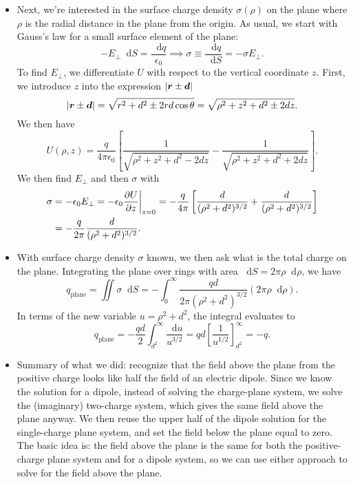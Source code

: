\documentclass[11pt, a4paper]{article}
\newcommand{\diff}{\mathop{}\!\mathrm{d}} %
\renewcommand{\vec}[1]{\bm{#1}} %
\renewcommand{\r}{\vec{r}}
\newcommand{\ee}{\epsilon_{0}}  %
\begin{document}
\begin{itemize}
	\item Next, we're interested in the surface charge density $ \sigma(\rho) $ on the plane where $ \rho $ is the radial distance in the plane from the origin. As usual, we start with Gauss's law for a small surface element of the plane: 
	\begin{equation*}
		-E_{\perp}\diff S = \frac{\diff q}{\ee} \implies \sigma \equiv \frac{\diff q}{\diff S} =  -\sigma E_{\perp}.
	\end{equation*}
	To find $ E_{\perp} $, we differentiate $ U $ with respect to the vertical coordinate $ z $. First, we introduce $ z $ into the expression $ \abs{\r \pm \vec{d}} $
	\begin{equation*}
		\abs{\r \pm \vec{d}} = \sqrt{r^{2}+d^{2} \pm 2rd\cos \theta} = \sqrt{\rho^{2} + z^{2} + d^{2} \pm 2dz}.
	\end{equation*}
	We then have
	\begin{equation*}
		U(\rho, z) = \frac{q}{4\pi \ee}\left[\frac{1}{\sqrt{\rho^{2} + z^{2} + d^{2} - 2dz}} - \frac{1}{\sqrt{\rho^{2} + z^{2} + d^{2} + 2dz}}\right].
	\end{equation*}
	We then find $ E_{\perp} $ and then $ \sigma $ with
	\begin{align*}
		\sigma &= - \ee E_{\perp} = -\ee \pdv{U}{z}\bigg|_{z=0} = -\frac{q}{4\pi}\left[\frac{d}{(\rho^{2}+d^{2})^{3/2}} +  \frac{d}{(\rho^{2}+d^{2})^{3/2}} \right]\\
		& = -\frac{q}{2\pi} \frac{d}{(\rho^{2}+d^{2})^{3/2}}.
	\end{align*}
	
	\item With surface charge density $ \sigma $ known, we then ask what is the total charge on the plane. Integrating the plane over rings with area $ \diff S = 2\pi \rho \diff \rho $, we have
	\begin{equation*}
		q_{\text{plane}} = \iint \sigma \diff S = - \int_{0}^{\infty} \frac{qd}{2\pi(\rho^{2}+d^{2})^{3/2}} (2\pi \rho \diff \rho).
	\end{equation*}
	In terms of the new variable $ u = \rho^{2} + d^{2} $, the integral evaluates to
	\begin{equation*}
		q_{\text{plane}} = -\frac{qd}{2}\int_{d^{2}}^{\infty}\frac{\diff u}{u^{3/2}} = qd \left[\frac{1}{u^{1/2}}\right]_{d^{2}}^{\infty} = -q.
	\end{equation*}
	
	\item Summary of what we did: recognize that the field above the plane from the positive charge looks like half the field of an electric dipole. Since we know the solution for a dipole, instead of solving the charge-plane system, we solve the (imaginary) two-charge system, which gives the same field above the plane anyway. We then reuse the upper half of the dipole solution for the single-charge plane system, and set the field below the plane equal to zero. The basic idea is: the field above the plane is the same for both the positive-charge plane system and for a dipole system, so we can use either approach to solve for the field above the plane. 
	

\end{itemize}
\end{document}
